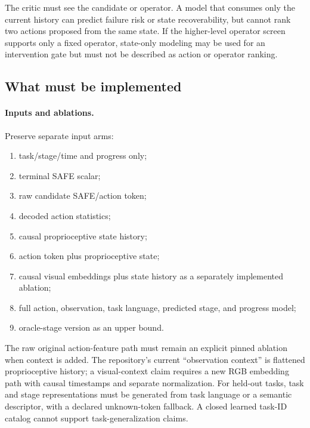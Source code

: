 The critic must see the candidate or operator. A model that consumes only the current history can predict failure risk or state recoverability, but cannot rank two actions proposed from the same state. If the higher-level operator screen supports only a fixed operator, state-only modeling may be used for an intervention gate but must not be described as action or operator ranking.

\subsection{What must be implemented}

\paragraph{Inputs and ablations.}
Preserve separate input arms:
\begin{enumerate}
  \item task/stage/time and progress only;
  \item terminal SAFE scalar;
  \item raw candidate SAFE/action token;
  \item decoded action statistics;
  \item causal proprioceptive state history;
  \item action token plus proprioceptive state;
  \item causal visual embeddings plus state history as a separately implemented ablation;
  \item full action, observation, task language, predicted stage, and progress model;
  \item oracle-stage version as an upper bound.
\end{enumerate}
The raw original action-feature path must remain an explicit pinned ablation when context is added. The repository's current ``observation context'' is flattened proprioceptive history; a visual-context claim requires a new RGB embedding path with causal timestamps and separate normalization. For held-out tasks, task and stage representations must be generated from task language or a semantic descriptor, with a declared unknown-token fallback. A closed learned task-ID catalog cannot support task-generalization claims.

